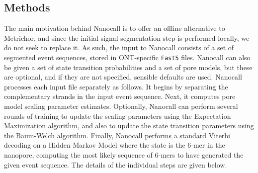 \documentclass{bioinfo}
\begin{document}
\begin{methods}
\section{Methods}

The main motivation behind Nanocall is to offer an offline alternative to Metrichor, and since the initial signal segmentation step is performed locally, we do not seek to replace it. As such, the input to Nanocall consists of a set of segmented event sequences, stored in ONT-specific \texttt{Fast5} files. Nanocall can also be given a set of state transition probabilities and a set of pore models, but these are optional, and if they are not specified, sensible defaults are used. Nanocall processes each input file separately as follows. It begins by separating the complementary strands in the input event sequence. Next, it computes pore model scaling parameter estimates. Optionally, Nanocall can perform several rounds of training to update the scaling parameters using the Expectation Maximization algorithm, and also to update the state transition parameters using the Baum-Welch algorithm. Finally, Nanocall performs a standard Viterbi decoding on a Hidden Markov Model where the state is the 6-mer in the nanopore, computing the most likely sequence of 6-mers to have generated the given event sequence. The details of the individual steps are given below.


\end{methods}
\end{document}
